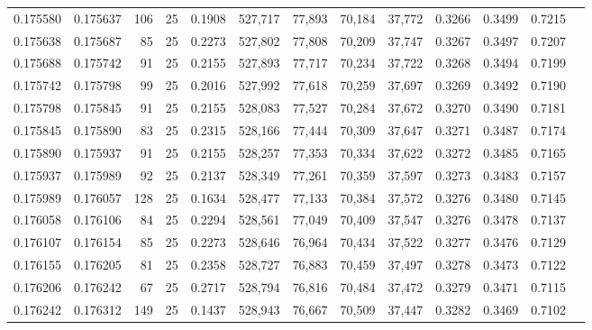 \begin{tabular}{rrrrrrrrrrrrr}
0.175580 & 0.175637 &   106 &  25 &                                     0.1908 & 527,717 &  77,893 &  70,184 &  37,772 & 0.3266 & 0.3499 & 0.7215 \\
0.175638 & 0.175687 &    85 &  25 &                                     0.2273 & 527,802 &  77,808 &  70,209 &  37,747 & 0.3267 & 0.3497 & 0.7207 \\
0.175688 & 0.175742 &    91 &  25 &                                     0.2155 & 527,893 &  77,717 &  70,234 &  37,722 & 0.3268 & 0.3494 & 0.7199 \\
0.175742 & 0.175798 &    99 &  25 &                                     0.2016 & 527,992 &  77,618 &  70,259 &  37,697 & 0.3269 & 0.3492 & 0.7190 \\
0.175798 & 0.175845 &    91 &  25 &                                     0.2155 & 528,083 &  77,527 &  70,284 &  37,672 & 0.3270 & 0.3490 & 0.7181 \\
0.175845 & 0.175890 &    83 &  25 &                                     0.2315 & 528,166 &  77,444 &  70,309 &  37,647 & 0.3271 & 0.3487 & 0.7174 \\
0.175890 & 0.175937 &    91 &  25 &                                     0.2155 & 528,257 &  77,353 &  70,334 &  37,622 & 0.3272 & 0.3485 & 0.7165 \\
0.175937 & 0.175989 &    92 &  25 &                                     0.2137 & 528,349 &  77,261 &  70,359 &  37,597 & 0.3273 & 0.3483 & 0.7157 \\
0.175989 & 0.176057 &   128 &  25 &                                     0.1634 & 528,477 &  77,133 &  70,384 &  37,572 & 0.3276 & 0.3480 & 0.7145 \\
0.176058 & 0.176106 &    84 &  25 &                                     0.2294 & 528,561 &  77,049 &  70,409 &  37,547 & 0.3276 & 0.3478 & 0.7137 \\
0.176107 & 0.176154 &    85 &  25 &                                     0.2273 & 528,646 &  76,964 &  70,434 &  37,522 & 0.3277 & 0.3476 & 0.7129 \\
0.176155 & 0.176205 &    81 &  25 &                                     0.2358 & 528,727 &  76,883 &  70,459 &  37,497 & 0.3278 & 0.3473 & 0.7122 \\
0.176206 & 0.176242 &    67 &  25 &                                     0.2717 & 528,794 &  76,816 &  70,484 &  37,472 & 0.3279 & 0.3471 & 0.7115 \\
0.176242 & 0.176312 &   149 &  25 &                                     0.1437 & 528,943 &  76,667 &  70,509 &  37,447 & 0.3282 & 0.3469 & 0.7102 \\

\end{tabular}

